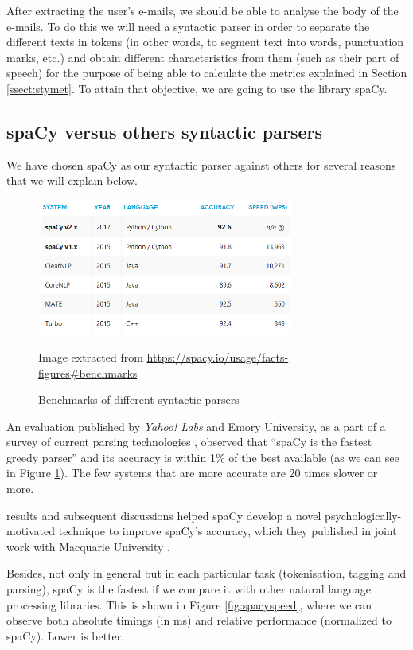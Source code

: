 After extracting the user's e-mails, we should be able to analyse the body of the e-mails. To do this we will need a syntactic parser in order to separate the different texts in tokens (in other words, to segment text into words, punctuation marks, etc.) and obtain different characteristics from them (such as their part of speech) for the purpose of being able to calculate the metrics explained in Section \ref{ssect:stymet}. To attain that objective, we are going to use the library spaCy.

\subsection{spaCy versus others syntactic parsers}

We have chosen spaCy as our syntactic parser against others for several reasons that we will explain below.

\begin{figure}[h]
	\centering%
	\includegraphics[width = 0.75\textwidth]{Imagenes/Bitmap/Spacy/spacyeval.png}%
	\caption{Benchmarks of different syntactic parsers}%
	Image extracted from \url{https://spacy.io/usage/facts-figures#benchmarks}
	\label{fig:spacyeval}
\end{figure}

An evaluation published by \textit{Yahoo! Labs} and Emory University, as a part of a survey of current parsing technologies \citep{choi2015depends}, observed that ``spaCy is the fastest greedy parser'' and its accuracy is within 1\% of the best available (as we can see in Figure \ref{fig:spacyeval}). The few systems that are more accurate are 20 times slower or more.

\cite{choi2015depends} results and subsequent discussions helped spaCy develop a novel psychologically-motivated technique to improve spaCy's accuracy, which they published in joint work with Macquarie University \citep{honnibal2015improved}.

Besides, not only in general but in each particular task (tokenisation, tagging and parsing), spaCy is the fastest if we compare it with other natural language processing libraries. This is shown in Figure \ref{fig:spacyspeed}, where we can observe both absolute timings (in ms) and relative performance (normalized to spaCy). Lower is better.


